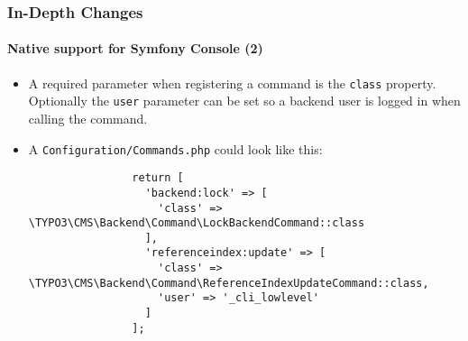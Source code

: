 \begin{frame}[fragile]
	\frametitle{In-Depth Changes}
	\framesubtitle{Native support for Symfony Console (2)}

	\lstset{basicstyle=\tiny\ttfamily}

	\begin{itemize}

		\item A required parameter when registering a command is the \texttt{class} property.
			Optionally the \texttt{user} parameter can be set so a backend user is logged
			in when calling the command.

		\item A \texttt{Configuration/Commands.php} could look like this:

			\begin{lstlisting}
				return [
				  'backend:lock' => [
				    'class' => \TYPO3\CMS\Backend\Command\LockBackendCommand::class
				  ],
				  'referenceindex:update' => [
				    'class' => \TYPO3\CMS\Backend\Command\ReferenceIndexUpdateCommand::class,
				    'user' => '_cli_lowlevel'
				  ]
				];
			\end{lstlisting}

	\end{itemize}

\end{frame}

